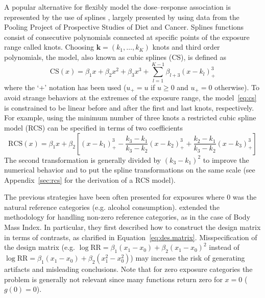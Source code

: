 \documentclass[11pt,a4paper,twoside,openany]{book}\usepackage{knitr}
\begin{document}
{A popular alternative for flexibly model the dose--response association is represented by the use of splines \citep{de1978practical}, largely presented by \cite{orsini2011meta} using data from the Pooling Project of Prospective Studies of Diet and Cancer. Splines functions consist of consecutive polynomials connected at specific points of the exposure range called knots. Choosing $\mathbf{k} = \left(k_1, \dots, k_K\right)$ knots and third order polynomials, the model, also known as cubic splines (CS), is defined as
\begin{equation}
\mathrm{CS}(x) = \beta_1 x + \beta_2x^2 + \beta_3x^3 + \sum_{l = 1}^{K-1} \beta_{l+3}(x - k_l)_{+}^3
\label{eq:cs}
\end{equation}
\noindent where the `+' notation has been used ($u_+ = u$ if $u \ge 0$ and $u_+ = 0$ otherwise). To avoid strange behaviors at the extremes of the exposure range, the model~\ref{eq:cs} is constrained to be linear before and after the first and last knots, respectively. For example, using the minimum number of three knots a restricted cubic spline model (RCS) can be specified in terms of two coefficients
\begin{equation}
\mathrm{RCS}(x) = \beta_1 x + \beta_2 \left[ \left( x - k_1 \right)_{+}^3 - \frac{k_3 - k_1}{k_3 - k_2} \left( x - k_2  \right)_{+}^3 + \frac{k_2 - k_1}{k_3 - k_2} \left(x - k_3 \right)_{+}^3\right]
\label{eq:rcs}
\end{equation}
\noindent The second transformation is generally divided by $(k_3 - k_1)^2$ to improve the numerical behavior and to put the spline transformations on the same scale \citep{harrell2015regression} (see Appendix~\ref{sec:rcs} for the derivation of a RCS model).

The previous strategies have been often presented for exposures where 0 was the natural reference categories (e.g. alcohol consumption). \cite{liu2009two} extended the methodology for handling non-zero reference categories, as in the case of Body Mass Index. In particular, they first described how to construct the design matrix in terms of contrasts, as clarified in Equation~\ref{eq:des.matrix}. Misspecification of the design matrix (e.g. $\log \mathrm{RR} = \beta_1 (x_1 - x_0) + \beta_2 (x_1 - x_0)^2$ instead of $\log \mathrm{RR} = \beta_1 (x_1 - x_0) + \beta_2 (x_1^2 - x_0^2)$) may increase the risk of generating artifacts and misleading conclusions. Note that for zero exposure categories the problem is generally not relevant since many functions return zero for $x = 0$ ($g(0) = 0$).

}
\end{document}
